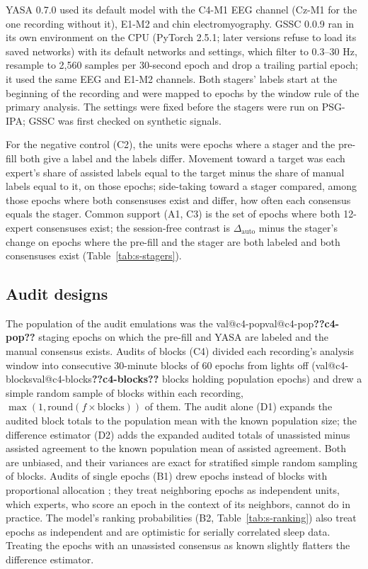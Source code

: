 \documentclass[11pt]{article}
\makeatletter
\newcommand{\val}[1]{\ifcsname val@#1\endcsname\csname val@#1\endcsname\else\textbf{??#1??}\PackageWarning{values}{Undefined value #1}\fi}
\newcommand{\dauto}{\Delta_{\mathrm{auto}}}
\makeatother
\begin{document}
YASA 0.7.0 \citep{vallat2021} used its default model with the C4-M1 EEG channel (Cz-M1 for the one recording without
it), E1-M2 and chin electromyography. GSSC 0.0.9 \citep{hanna2023} ran in its own environment on the CPU (PyTorch 2.5.1;
later versions refuse to load its saved networks) with its default networks and settings, which filter to 0.3--30 Hz,
resample to 2,560 samples per 30-second epoch and drop a trailing partial epoch; it used the same EEG and E1-M2
channels. Both stagers' labels start at the beginning of the recording and were mapped to epochs by the window rule
of the primary analysis. The settings were fixed before the stagers were run on PSG-IPA; GSSC was first checked on
synthetic signals.

For the negative control (C2), the units were epochs where a stager and the pre-fill both give a label and the labels
differ. Movement toward a target was each expert's share of assisted labels equal to the target minus the share of
manual labels equal to it, on those epochs; side-taking toward a stager compared, among those epochs where both
consensuses exist and differ, how often each consensus equals the stager. Common support (A1, C3) is the set of epochs
where both 12-expert consensuses exist; the session-free contrast is $\dauto$ minus the stager's change on epochs where
the pre-fill and the stager are both labeled and both consensuses exist (Table~\ref{tab:s-stagers}).

\subsection*{Audit designs}

The population of the audit emulations was the \val{c4-pop} staging epochs on which the pre-fill and YASA are labeled
and the manual consensus exists. Audits of blocks (C4) divided each recording's analysis window into consecutive
30-minute blocks of 60 epochs from lights off (\val{c4-blocks} blocks holding population epochs) and drew a simple
random sample of blocks within each recording, $\max(1, \mathrm{round}(f \times \text{blocks}))$ of them. The audit
alone (D1) expands the audited block totals to the population mean with the known population size; the difference
estimator (D2) adds the expanded audited totals of unassisted minus assisted agreement to the known population mean of
assisted agreement. Both are unbiased, and their variances are exact for stratified simple random sampling of blocks.
Audits of single epochs (B1) drew epochs instead of blocks with proportional allocation \citep{cochran1977}; they
treat neighboring epochs as independent units, which experts, who score an epoch in the context of its neighbors,
cannot do in practice. The model's ranking probabilities (B2, Table~\ref{tab:s-ranking}) also treat epochs as
independent and are optimistic for serially correlated sleep data. Treating the epochs with an unassisted consensus as
known slightly flatters the difference estimator.
\end{document}

